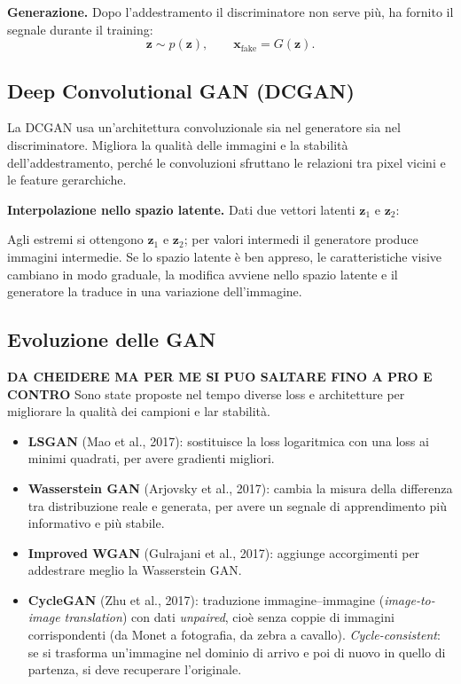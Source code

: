 \documentclass[11pt,a4paper]{article}
\begin{document}
\textbf{Generazione.} Dopo l'addestramento il discriminatore non serve più, ha
fornito il segnale durante il training:
\[
\mathbf{z}\sim p(\mathbf{z}),\qquad \mathbf{x}_{\mathrm{fake}}=G(\mathbf{z}).
\]

\subsection{Deep Convolutional GAN (DCGAN)}

La DCGAN usa un'architettura convoluzionale sia nel generatore sia nel
discriminatore. Migliora la qualità delle immagini e la stabilità
dell'addestramento, perché le convoluzioni sfruttano le relazioni tra pixel
vicini e le feature gerarchiche.

\textbf{Interpolazione nello spazio latente.} Dati due vettori latenti
$\mathbf{z}_1$ e $\mathbf{z}_2$:

Agli estremi si ottengono $\mathbf{z}_1$ e $\mathbf{z}_2$; per valori intermedi
il generatore produce immagini intermedie. Se lo spazio latente è ben appreso,
le caratteristiche visive cambiano in modo graduale,
la modifica avviene nello spazio latente e il generatore la traduce in una
variazione dell'immagine.

\subsection{Evoluzione delle GAN} 
\textbf{DA CHEIDERE MA PER ME SI PUO SALTARE FINO A PRO E CONTRO}
Sono state proposte nel tempo diverse loss e architetture per migliorare la
qualità dei campioni e lar stabilità.

\begin{itemize}
  \item \textbf{LSGAN} (Mao et al., 2017): sostituisce la loss logaritmica con
        una loss ai minimi quadrati, per avere gradienti migliori.
  \item \textbf{Wasserstein GAN} (Arjovsky et al., 2017): cambia la misura della
        differenza tra distribuzione reale e generata, per avere un segnale di
        apprendimento più informativo e più stabile.
  \item \textbf{Improved WGAN} (Gulrajani et al., 2017): aggiunge accorgimenti
        per addestrare meglio la Wasserstein GAN.
  \item \textbf{CycleGAN} (Zhu et al., 2017): traduzione immagine--immagine
        (\emph{image-to-image translation}) con dati \emph{unpaired}, cioè senza
        coppie di immagini corrispondenti (da Monet a fotografia, da zebra a
        cavallo). \emph{Cycle-consistent}: se si trasforma un'immagine nel
        dominio di arrivo e poi di nuovo in quello di partenza, si deve
        recuperare l'originale.
\end{itemize}
\end{document}
